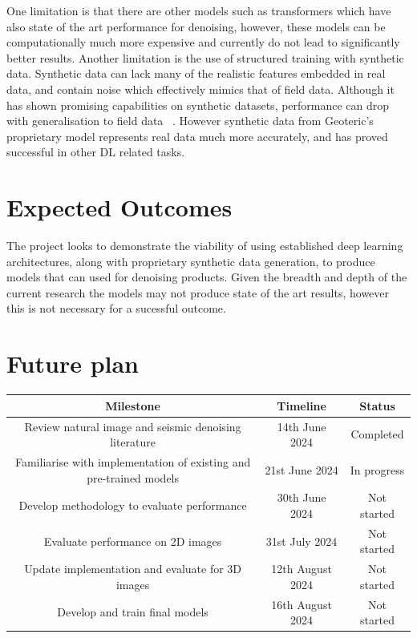 \documentclass[project-plan]{report-template}
\begin{document}
One limitation is that there are other models such as transformers which have also state of the art performance for denoising, however, these models can be computationally much more expensive and currently do not lead to significantly better results.  Another limitation is the use of structured training with synthetic data. Synthetic data can lack many of the realistic features embedded in real data, and contain noise which effectively mimics that of field data. Although it has shown promising capabilities on synthetic datasets, performance can drop with generalisation to field data ~\cite{zhang2019unsupervised}. However synthetic data from Geoteric's proprietary model represents real data much more accurately, and has proved successful in other DL related tasks.

\section{Expected Outcomes}
The project looks to demonstrate the viability of using established deep learning architectures, along with proprietary synthetic data generation, to produce models that can used for denoising products. Given the breadth and depth of the current research the models may not produce state of the art results, however this is not necessary for a sucessful outcome.

\section{Future plan}
\begin{table}[h]
\centering
\begin{tabular}{|c|c|c|}
\hline
\textbf{Milestone} & \textbf{Timeline} & \textbf{Status} \\
\hline
Review natural image and seismic denoising literature & 14th June 2024 & Completed \\
\hline
Familiarise with implementation of existing and pre-trained models & 21st June 2024 &  In progress \\ 
\hline
Develop methodology to evaluate performance & 30th June 2024 & Not started \\
\hline
Evaluate performance on 2D images  & 31st July 2024 & Not started \\
\hline
Update implementation and evaluate for 3D images  & 12th August 2024 & Not started \\
\hline
Develop and train final models & 16th August 2024 & Not started \\
\hline
\end{tabular}
\end{table}


\end{document}
